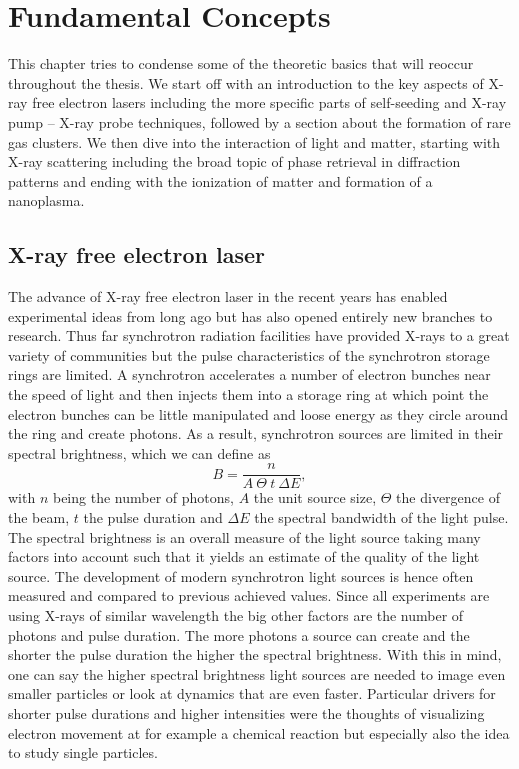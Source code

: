\chapter{Fundamental Concepts}\label{ch:fundamental_concepts}
This chapter tries to condense some of the theoretic basics that will reoccur throughout the thesis. We start off with an introduction to the key aspects of X-ray free electron lasers including the more specific parts of self-seeding and X-ray pump -- X-ray probe techniques, followed by a section about the formation of rare gas clusters. We then dive into the interaction of light and matter, starting with X-ray scattering including the broad topic of phase retrieval in diffraction patterns and ending with the ionization of matter and formation of a nanoplasma.
\section{X-ray free electron laser}
The advance of X-ray free electron laser in the recent years has enabled experimental ideas from long ago but has also opened entirely new branches to research. Thus far synchrotron radiation facilities have provided X-rays to a great variety of communities but the pulse characteristics of the synchrotron storage rings are limited. A synchrotron accelerates a number of electron bunches near the speed of light and then injects them into a storage ring at which point the electron bunches can be little manipulated and loose energy as they circle around the ring and create photons. As a result, synchrotron sources are limited in their spectral brightness, which we can define as
\begin{equation}
B = \frac{n}{A\ \Theta\ t\ \Delta\! E},
\label{eq:spectral-brightness}
\end{equation}
with $n$ being the number of photons, $A$ the unit source size, $\Theta$ the divergence of the beam, $t$ the pulse duration and $\Delta\! E$ the spectral bandwidth of the light pulse. The spectral brightness is an overall measure of the light source taking many factors into account such that it yields an estimate of the quality of the light source. The development of modern synchrotron light sources is hence often measured and compared to previous achieved values. Since all experiments are using X-rays of similar wavelength the big other factors are the number of photons and pulse duration. The more photons a source can create and the shorter the pulse duration the higher the spectral brightness. With this in mind, one can say the higher spectral brightness light sources are needed to image even smaller particles or look at dynamics that are even faster. Particular drivers for shorter pulse durations and higher intensities were the thoughts of visualizing electron movement at for example a chemical reaction but especially also the idea to study single particles.
